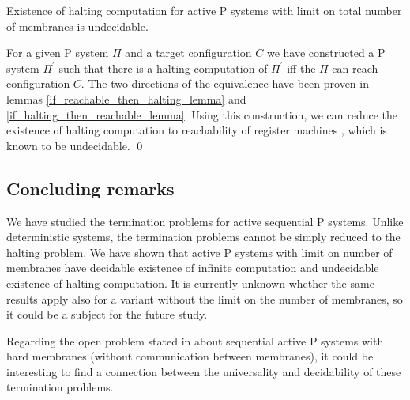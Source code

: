 \begin{veta}
\label{existence_of_halting_theorem}
  Existence of halting computation for active P systems with limit on total number of membranes is undecidable.
\end{veta}

\begin{dokaz}
  For a given P system $\Pi$ and a target configuration $C$ we have constructed a P system $\Pi^\prime$ such that there is a halting computation of $\Pi^\prime$ iff the $\Pi$ can reach configuration $C$. The two directions of the equivalence have been proven in lemmas \ref{if_reachable_then_halting_lemma} and \ref{if_halting_then_reachable_lemma}. Using this construction, we can reduce the existence of halting computation to reachability of register machines \cite{Ibarra05Active}, which is known to be undecidable. \qed
\end{dokaz}



\subsection{Concluding remarks} %
\label{sub:concluding_remarks}

We have studied the termination problems for active sequential P systems. Unlike deterministic systems, the termination problems cannot be simply reduced to the halting problem. We have shown that active P systems with limit on number of membranes have decidable existence of infinite computation and undecidable existence of halting computation. It is currently unknown whether the same results apply also for a variant without the limit on the number of membranes, so it could be a subject for the future study.

Regarding the open problem stated in \cite{Ibarra05Active} about sequential active P systems with hard membranes (without communication between membranes), it could be interesting to find a connection between the universality and decidability of these termination problems.

